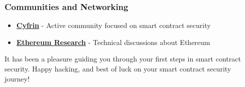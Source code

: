\documentclass[12pt]{article}
\begin{document}
\subsubsection*{Communities and Networking}

\begin{itemize}
    \item \textbf{\href{https://discord.gg/cyfrin}{Cyfrin}} - Active community focused on smart contract security
    \item \textbf{\href{https://discord.gg/qGpsxSA}{Ethereum Research}} - Technical discussions about Ethereum
\end{itemize}

\noindent
It has been a pleasure guiding you through your first steps in smart contract security. Happy hacking, and best of luck on your smart contract security journey!
\end{document}
